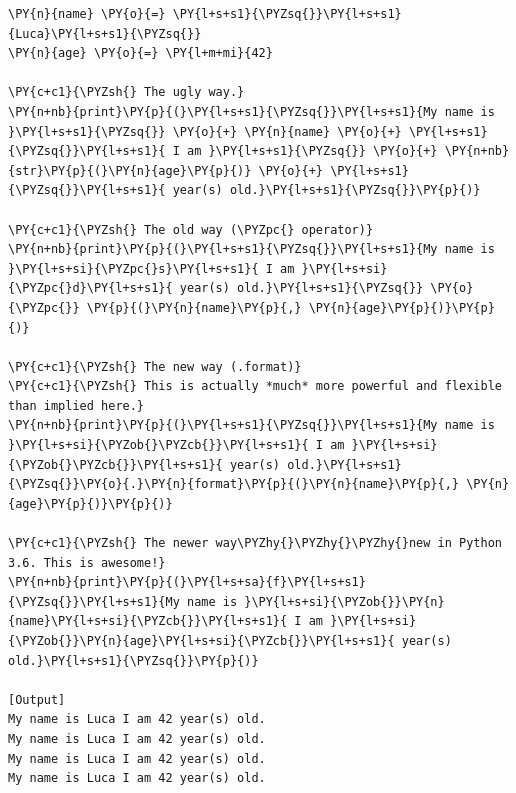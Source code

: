 \begin{Verbatim}[label=\makebox{\url{https://github.com/lucabaldini/cmepda/tree/master/slides/latex/snippets/string\_formatting.py}},commandchars=\\\{\}]
\PY{n}{name} \PY{o}{=} \PY{l+s+s1}{\PYZsq{}}\PY{l+s+s1}{Luca}\PY{l+s+s1}{\PYZsq{}}
\PY{n}{age} \PY{o}{=} \PY{l+m+mi}{42}

\PY{c+c1}{\PYZsh{} The ugly way.}
\PY{n+nb}{print}\PY{p}{(}\PY{l+s+s1}{\PYZsq{}}\PY{l+s+s1}{My name is }\PY{l+s+s1}{\PYZsq{}} \PY{o}{+} \PY{n}{name} \PY{o}{+} \PY{l+s+s1}{\PYZsq{}}\PY{l+s+s1}{ I am }\PY{l+s+s1}{\PYZsq{}} \PY{o}{+} \PY{n+nb}{str}\PY{p}{(}\PY{n}{age}\PY{p}{)} \PY{o}{+} \PY{l+s+s1}{\PYZsq{}}\PY{l+s+s1}{ year(s) old.}\PY{l+s+s1}{\PYZsq{}}\PY{p}{)}

\PY{c+c1}{\PYZsh{} The old way (\PYZpc{} operator)}
\PY{n+nb}{print}\PY{p}{(}\PY{l+s+s1}{\PYZsq{}}\PY{l+s+s1}{My name is }\PY{l+s+si}{\PYZpc{}s}\PY{l+s+s1}{ I am }\PY{l+s+si}{\PYZpc{}d}\PY{l+s+s1}{ year(s) old.}\PY{l+s+s1}{\PYZsq{}} \PY{o}{\PYZpc{}} \PY{p}{(}\PY{n}{name}\PY{p}{,} \PY{n}{age}\PY{p}{)}\PY{p}{)}

\PY{c+c1}{\PYZsh{} The new way (.format)}
\PY{c+c1}{\PYZsh{} This is actually *much* more powerful and flexible than implied here.}
\PY{n+nb}{print}\PY{p}{(}\PY{l+s+s1}{\PYZsq{}}\PY{l+s+s1}{My name is }\PY{l+s+si}{\PYZob{}\PYZcb{}}\PY{l+s+s1}{ I am }\PY{l+s+si}{\PYZob{}\PYZcb{}}\PY{l+s+s1}{ year(s) old.}\PY{l+s+s1}{\PYZsq{}}\PY{o}{.}\PY{n}{format}\PY{p}{(}\PY{n}{name}\PY{p}{,} \PY{n}{age}\PY{p}{)}\PY{p}{)}

\PY{c+c1}{\PYZsh{} The newer way\PYZhy{}\PYZhy{}\PYZhy{}new in Python 3.6. This is awesome!}
\PY{n+nb}{print}\PY{p}{(}\PY{l+s+sa}{f}\PY{l+s+s1}{\PYZsq{}}\PY{l+s+s1}{My name is }\PY{l+s+si}{\PYZob{}}\PY{n}{name}\PY{l+s+si}{\PYZcb{}}\PY{l+s+s1}{ I am }\PY{l+s+si}{\PYZob{}}\PY{n}{age}\PY{l+s+si}{\PYZcb{}}\PY{l+s+s1}{ year(s) old.}\PY{l+s+s1}{\PYZsq{}}\PY{p}{)}

[Output]
My name is Luca I am 42 year(s) old.
My name is Luca I am 42 year(s) old.
My name is Luca I am 42 year(s) old.
My name is Luca I am 42 year(s) old.
\end{Verbatim}